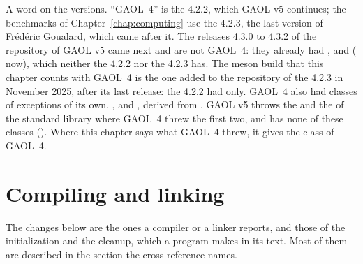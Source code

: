 \medskip
A word on the versions. ``GAOL~4'' is the 4.2.2, which GAOL v5 continues;
the benchmarks of Chapter~\ref{chap:computing} use the 4.2.3, the last
version of Fr\'ed\'eric Goualard, which came after it. The releases 4.3.0 to
4.3.2 of the repository of GAOL v5 came next and are not GAOL~4: they already
had ,  and 
( now), which neither the 4.2.2 nor the 4.2.3 has. The
meson build that this chapter counts with GAOL~4 is the one added to the
repository of the 4.2.3 in November 2025, after its last release: the 4.2.2 had
 only.
GAOL~4 also had classes of exceptions of its own,
,  and
, derived from . GAOL
v5 throws the  and the 
of the standard library where GAOL~4 threw the first two, and has none of
these classes (). Where this chapter says what GAOL~4
threw, it gives the class of GAOL~4.

\section{Compiling and linking}\label{sec:migration-compile}
%

The changes below are the ones a compiler or a linker reports, and those of
the initialization and the cleanup, which a program makes in its text. Most of
them are described in the section the cross-reference names.

